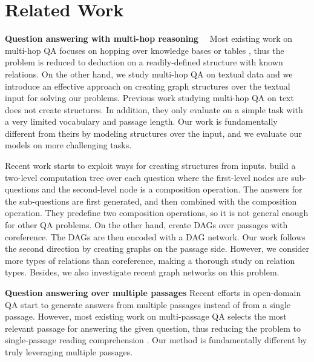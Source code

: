 \documentclass[letterpaper]{article}
\begin{document}
\section{Related Work}

\textbf{Question answering with multi-hop reasoning}~~
Most existing work on multi-hop QA focuses on hopping over knowledge bases or tables \citep{jain2016question,neelakantan2016neural,yin2016neural}, thus the problem is reduced to deduction on a readily-defined structure with known relations.
On the other hand, we study multi-hop QA on textual data and we introduce an effective approach on creating graph structures over the textual input for solving our problems.
Previous work \citep{hill2015goldilocks,shen2017reasonet} studying multi-hop QA on text does not create structures.
In addition, they only evaluate on a simple task \citep{weston2015towards} with a very limited vocabulary and passage length.
Our work is fundamentally different from theirs by modeling structures over the input, and we evaluate our models on more challenging tasks.



Recent work starts to exploit ways for creating structures from inputs.
\citet{N18-1059} build a two-level computation tree over each question where the first-level nodes are sub-questions and the second-level node is a composition operation.
The answers for the sub-questions are first generated, and then combined with the composition operation.
They predefine two composition operations, so it is not general enough for other QA problems.
On the other hand, \citet{N18-2007} create DAGs over passages with coreference. 
The DAGs are then encoded with a DAG network.
Our work follows the second direction by creating graphs on the passage side.
However, we consider more types of relations than coreference, making a thorough study on relation types.
Besides, we also investigate recent graph networks on this problem.




\vspace{0.2em}
\textbf{Question answering over multiple passages}
Recent efforts in open-domain QA start to generate answers from multiple passages instead of from a single passage.
However, most existing work on multi-passage QA selects the most relevant passage for answering the given question, thus reducing the problem to single-passage reading comprehension \citep{chen-EtAl:2017:Long4,dunn2017searchqa,dhingra2017quasar,wang2018r3,clark2018simple}.
Our method is fundamentally different by truly leveraging multiple passages.
\end{document}
